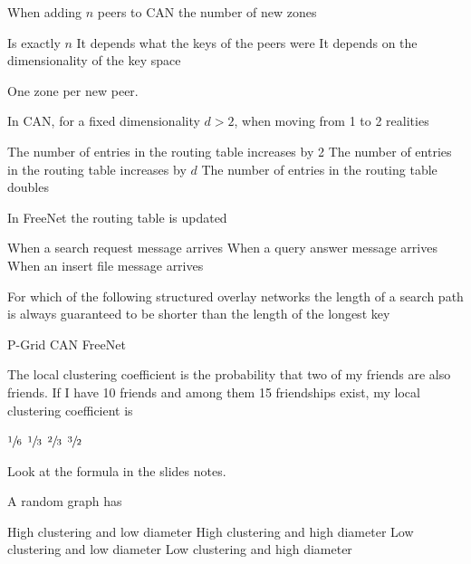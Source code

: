 \documentclass[12pt,a4paper]{exam} %
\begin{document}
\begin{flushleft}
\begin{multicols*}{2}
\begin{questions}
\question When adding $n$ peers to CAN the number of new zones
\begin{checkboxes}
\CorrectChoice Is exactly $n$
\choice It depends what the keys of the peers were
\choice It depends on the dimensionality of the key space
\end{checkboxes}
\begin{solution}
One zone per new peer.
\end{solution}

\question In CAN, for a fixed dimensionality $d>2$, when moving from 1 to 2 realities
\begin{checkboxes}
\choice  The number of entries in the routing table increases by 2
\choice The number of entries in the routing table increases by $d$
\CorrectChoice The number of entries in the routing table doubles
\end{checkboxes}

\question In FreeNet the routing table is updated
\begin{checkboxes}
\choice When a search request message arrives
\CorrectChoice When a query answer message arrives
\choice When an insert file message arrives
\end{checkboxes}

\question For which of the following structured overlay networks the length of a search path is always guaranteed to be shorter than the length of the longest key
\begin{checkboxes}
\CorrectChoice P-Grid
\choice CAN
\choice FreeNet
\end{checkboxes}

\question The local clustering coefficient is the probability that two of my friends are also friends. If I have 10 friends and among them 15 friendships exist, my local clustering coefficient is
\begin{checkboxes}
\choice $\sfrac{1}{6}$
\CorrectChoice $\sfrac{1}{3}$
\choice $\sfrac{2}{3}$
\choice $\sfrac{3}{2}$
\end{checkboxes}
\begin{solution}
Look at the formula in the slides notes.
\end{solution}

\question A random graph has
\begin{checkboxes}
\choice High clustering and low diameter
\choice High clustering and high diameter
\CorrectChoice Low clustering and low diameter
\choice Low clustering and high diameter
\end{checkboxes}


\end{questions}
\end{multicols*}
\end{flushleft}
\end{document}

